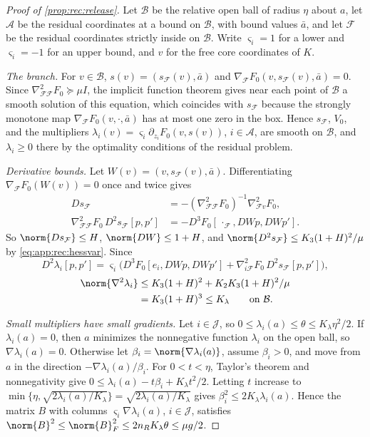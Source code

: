 \begin{proof}[Proof of \cref{prop:rec:release}]
Let $\mathcal B$ be the relative open ball of radius $\eta$ about $a$, let
$\mathcal A$ be the residual coordinates at a bound on $\mathcal B$, with bound
values $\bar a$, and let $\mathcal F$ be the residual coordinates strictly
inside on $\mathcal B$. Write $\varsigma_i=1$ for a lower and $\varsigma_i=-1$
for an upper bound, and $v$ for the free core coordinates of $K$.

\emph{The branch.} For $v\in\mathcal B$, $s(v)=(s_{\mathcal F}(v),\bar a)$ and
$\nabla_{\mathcal F}F_0(v,s_{\mathcal F}(v),\bar a)=0$. Since
$\nabla^2_{\mathcal F\mathcal F}F_0\succeq\mu I$, the implicit function theorem
gives near each point of $\mathcal B$ a smooth solution of this equation, which
coincides with $s_{\mathcal F}$ because the strongly monotone map
$\nabla_{\mathcal F}F_0(v,\cdot,\bar a)$ has at most one zero in the box. Hence
$s_{\mathcal F}$, $V_0$, and the multipliers
$\lambda_i(v)=\varsigma_i\partial_{z_i}F_0(v,s(v))$, $i\in\mathcal A$, are smooth
on $\mathcal B$, and $\lambda_i\ge0$ there by the optimality conditions of the
residual problem.

\emph{Derivative bounds.} Let $W(v)=(v,s_{\mathcal F}(v),\bar a)$. Differentiating
$\nabla_{\mathcal F}F_0(W(v))=0$ once and twice gives
\begin{align*}
 Ds_{\mathcal F}&=-(\nabla^2_{\mathcal F\mathcal F}F_0)^{-1}\nabla^2_{\mathcal Fv}F_0,\\
 \nabla^2_{\mathcal F\mathcal F}F_0\,D^2s_{\mathcal F}[p,p']
 &=-D^3F_0[\,\cdot_{\mathcal F},DWp,DWp'] .
\end{align*}
So $\norm{Ds_{\mathcal F}}\le H$, $\norm{DW}\le1+H$, and
$\norm{D^2s_{\mathcal F}}\le K_3(1+H)^2/\mu$ by \eqref{eq:app:rec:hessvar}.
Since
\[
 D^2\lambda_i[p,p']=\varsigma_i\bigl(D^3F_0[e_i,DWp,DWp']+
 \nabla^2_{i\mathcal F}F_0\,D^2s_{\mathcal F}[p,p']\bigr),
\]
\begin{align*}
 \norm{\nabla^2\lambda_i}&\le K_3(1+H)^2+K_2K_3(1+H)^2/\mu\\
 &=K_3(1+H)^3\le K_\lambda\qquad\text{on }\mathcal B .
\end{align*}

\emph{Small multipliers have small gradients.} Let $i\in\mathcal J$, so
$0\le\lambda_i(a)\le\theta\le K_\lambda\eta^2/2$. If $\lambda_i(a)=0$, then $a$
minimizes the nonnegative function $\lambda_i$ on the open ball, so
$\nabla\lambda_i(a)=0$. Otherwise let $\beta_i=\norm{\nabla\lambda_i(a)}$, assume
$\beta_i>0$, and move from $a$ in the direction $-\nabla\lambda_i(a)/\beta_i$.
For $0<t<\eta$, Taylor's theorem and nonnegativity give
$0\le\lambda_i(a)-t\beta_i+K_\lambda t^2/2$. Letting $t$ increase to
$\min\{\eta,\sqrt{2\lambda_i(a)/K_\lambda}\}=\sqrt{2\lambda_i(a)/K_\lambda}$ gives
$\beta_i^2\le2K_\lambda\lambda_i(a)$. Hence the matrix $B$ with columns
$\varsigma_i\nabla\lambda_i(a)$, $i\in\mathcal J$, satisfies
$\norm{B}^2\le\norm{B}_F^2\le2n_RK_\lambda\theta\le\mu g/2$.


\end{proof}
